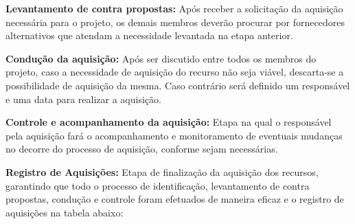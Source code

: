 \textbf{Levantamento de contra propostas:} Após receber a solicitação da aquisição
necessária para o projeto, os demais membros deverão procurar por fornecedores alternativos
que atendam a necessidade levantada na etapa anterior.

\textbf{Condução da aquisição:} Após ser discutido entre todos os membros do projeto,
  caso a necessidade de aquisição do recurso não seja viável, descarta-se a possibilidade
  de aquisição da mesma. Caso contrário será definido um responsável e uma data para realizar a aquisição.

\textbf{Controle e acompanhamento da aquisição:} Etapa na qual o responsável pela
aquisição fará o acompanhamento e monitoramento de eventuais mudanças no decorre
do processo de aquisição, conforme sejam necessárias.

\textbf{Registro de Aquisições:} Etapa de finalização da aquisição dos recursos,
garantindo que todo o processo de identificação, levantamento de contra propostas,
condução e controle foram efetuados de maneira eficaz e o registro de
aquisições na tabela abaixo:


